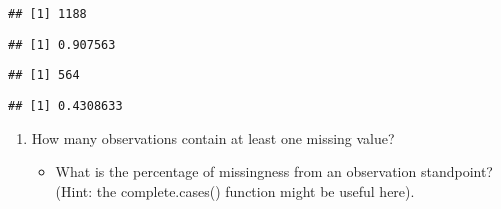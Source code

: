 \documentclass[]{article}
\newenvironment{Shaded}{\begin{snugshade}}{\end{snugshade}}
\newcommand{\KeywordTok}[1]{\textcolor[rgb]{0.13,0.29,0.53}{\textbf{#1}}}
\newcommand{\OperatorTok}[1]{\textcolor[rgb]{0.81,0.36,0.00}{\textbf{#1}}}
\newcommand{\NormalTok}[1]{#1}
\providecommand{\tightlist}{%
  \setlength{\itemsep}{0pt}\setlength{\parskip}{0pt}}
\begin{document}
\begin{verbatim}
## [1] 1188
\end{verbatim}

\begin{Shaded}
\end{Shaded}

\begin{verbatim}
## [1] 0.907563
\end{verbatim}

\begin{Shaded}
\end{Shaded}

\begin{verbatim}
## [1] 564
\end{verbatim}

\begin{Shaded}
\end{Shaded}

\begin{verbatim}
## [1] 0.4308633
\end{verbatim}

\begin{enumerate}
\def\labelenumi{\arabic{enumi}.}
\setcounter{enumi}{1}
\tightlist
\item
  How many observations contain at least one missing value?

  \begin{itemize}
  \tightlist
  \item
    What is the percentage of missingness from an observation
    standpoint? (Hint: the complete.cases() function might be useful
    here).
  \end{itemize}
\end{enumerate}
\end{document}
